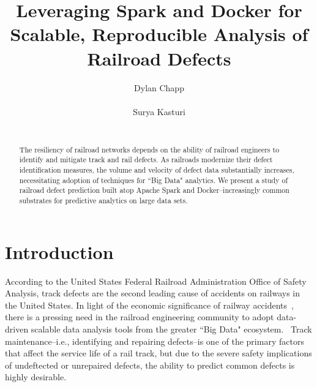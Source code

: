 \documentclass{sig-alternate-05-2015}
\begin{document}

\doi{}

\isbn{}

\conferenceinfo{}{}

\acmPrice{}

%
\conferenceinfo{}{}

\title{Leveraging Spark and Docker for Scalable, Reproducible Analysis of Railroad Defects}

\author{
\alignauthor
Dylan Chapp\\
       \\
\alignauthor
Surya Kasturi\\
       \\
}

\maketitle
\begin{abstract}
The resiliency of railroad networks depends on the ability of railroad 
engineers to identify and mitigate track and rail defects. As railroads
modernize their defect identification measures, the volume and velocity of 
defect data substantially increases, necessitating adoption of techniques
for ``Big Data" analytics. We present a study of railroad defect prediction 
built atop Apache Spark and Docker--increasingly common substrates for 
predictive analytics on large data sets. 
\end{abstract}

\section{Introduction}
According to the United States Federal Railroad Administration Office of Safety Analysis, track defects are the second leading cause of accidents on railways in the United States.
In light of the economic significance of railway accidents~\cite{Schafer:08}, there is a pressing need in the railroad engineering community to adopt data-driven scalable data analysis tools from the greater ``Big Data" ecosystem.~\cite{Zarembski:14} 
Track maintenance--i.e., identifying and repairing defects--is one of the primary factors that affect the service life of a rail track, but due to the severe safety implications of undeftected or unrepaired defects, the ability to predict common defects is highly desirable. 
\end{document}
